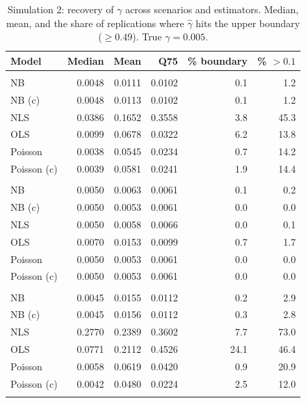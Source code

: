 \begin{table}[ht!]
\caption{\label{tbl-sim2-gamma}Simulation 2: recovery of $\gamma$ across scenarios and estimators. Median, mean, and the share of replications where $\hat\gamma$ hits the upper boundary ($\geq 0.49$). True $\gamma = 0.005$.} 
\fontsize{8.0pt}{9.0pt}\selectfont
\begin{tabular*}{\linewidth}{@{\extracolsep{\fill}}lrrrrr}
\toprule
Model & Median & Mean & Q75 & \% boundary & \% $>0.1$ \\ 
\midrule\addlinespace[2.5pt]
\multicolumn{6}{l}{NB($n$)-NB($m$)} \\[2.5pt] 
\midrule\addlinespace[2.5pt]
NB & 0.0048 & 0.0111 & 0.0102 & 0.1 & 1.2 \\ 
NB (c) & 0.0048 & 0.0113 & 0.0102 & 0.1 & 1.2 \\ 
NLS & 0.0386 & 0.1652 & 0.3558 & 3.8 & 45.3 \\ 
OLS & 0.0099 & 0.0678 & 0.0322 & 6.2 & 13.8 \\ 
Poisson & 0.0038 & 0.0545 & 0.0234 & 0.7 & 14.2 \\ 
Poisson (c) & 0.0039 & 0.0581 & 0.0241 & 1.9 & 14.4 \\ 
\midrule\addlinespace[2.5pt]
\multicolumn{6}{l}{NB($n$)-Po($m$)} \\[2.5pt] 
\midrule\addlinespace[2.5pt]
NB & 0.0050 & 0.0063 & 0.0061 & 0.1 & 0.2 \\ 
NB (c) & 0.0050 & 0.0053 & 0.0061 & 0.0 & 0.0 \\ 
NLS & 0.0050 & 0.0058 & 0.0066 & 0.0 & 0.1 \\ 
OLS & 0.0070 & 0.0153 & 0.0099 & 0.7 & 1.7 \\ 
Poisson & 0.0050 & 0.0053 & 0.0061 & 0.0 & 0.0 \\ 
Poisson (c) & 0.0050 & 0.0053 & 0.0061 & 0.0 & 0.0 \\ 
\midrule\addlinespace[2.5pt]
\multicolumn{6}{l}{Po($n$)-NB($m$)} \\[2.5pt] 
\midrule\addlinespace[2.5pt]
NB & 0.0045 & 0.0155 & 0.0112 & 0.2 & 2.9 \\ 
NB (c) & 0.0045 & 0.0156 & 0.0112 & 0.3 & 2.8 \\ 
NLS & 0.2770 & 0.2389 & 0.3602 & 7.7 & 73.0 \\ 
OLS & 0.0771 & 0.2112 & 0.4526 & 24.1 & 46.4 \\ 
Poisson & 0.0058 & 0.0619 & 0.0420 & 0.9 & 20.9 \\ 
Poisson (c) & 0.0042 & 0.0480 & 0.0224 & 2.5 & 12.0 \\ 
\midrule\addlinespace[2.5pt]

\end{tabular*}
\end{table}
